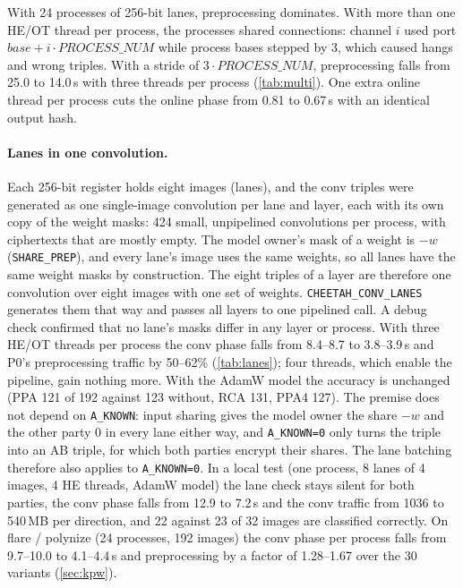 \documentclass[10pt,a4paper]{article}
\newcommand{\flag}[1]{\nolinkurl{#1}}
\newcommand{\s}{\,s\xspace}
\begin{document}
With 24 processes of 256-bit lanes, preprocessing dominates. With more than one HE/OT thread per process,
the processes shared connections: channel $i$ used port $\mathit{base} + i\cdot\mathit{PROCESS\_NUM}$ while
process bases stepped by 3, which caused hangs and wrong triples. With a stride of $3\cdot\mathit{PROCESS\_NUM}$, preprocessing falls from
25.0 to 14.0\s with three threads per process (\cref{tab:multi}). One extra online thread per process cuts
the online phase from 0.81 to 0.67\s with an identical output hash.

\paragraph{Lanes in one convolution.} Each 256-bit register holds eight images (lanes), and the conv triples were
generated as one single-image convolution per lane and layer, each with its own copy of the weight masks: 424 small,
unpipelined convolutions per process, with ciphertexts that are mostly empty. The model owner's mask of a weight is $-w$
(\flag{SHARE_PREP}), and every lane's image uses the same weights, so all lanes have the same weight masks by construction.
The eight triples of a layer are therefore one convolution over eight images with one set of weights.
\flag{CHEETAH_CONV_LANES} generates them that way and passes all layers to one pipelined call. A debug check confirmed
that no lane's masks differ in any layer or process. With three HE/OT threads per process the conv phase falls from 8.4--8.7 to 3.8--3.9\s
and P0's preprocessing traffic by 50--62\% (\cref{tab:lanes}); four threads, which enable the pipeline, gain nothing more.
With the AdamW model the accuracy is unchanged (PPA 121 of 192 against 123 without, RCA 131, PPA4 127).
The premise does not depend on \flag{A_KNOWN}: input sharing gives the model owner the share $-w$ and the other party 0 in
every lane either way, and \flag{A_KNOWN=0} only turns the triple into an AB triple, for which both parties encrypt their
shares. The lane batching therefore also applies to \flag{A_KNOWN=0}. In a local test (one process, 8 lanes of 4 images,
4 HE threads, AdamW model) the lane check stays silent for both parties, the conv phase falls from 12.9 to 7.2\s and the
conv traffic from 1036 to 540\,MB per direction, and 22 against 23 of 32 images are classified correctly. On flare /
polynize (24 processes, 192 images) the conv phase per process falls from 9.7--10.0 to 4.1--4.4\s and preprocessing by
a factor of 1.28--1.67 over the 30 variants (\cref{sec:kpw}).
\end{document}
